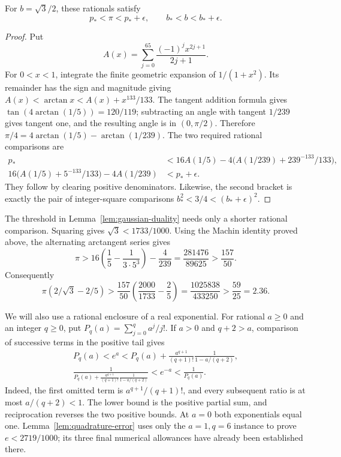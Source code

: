 \begin{lemma}\label{lem:rational-pi-b}
For $b=\sqrt3/2$, these rationals satisfy
\begin{equation}\label{eq:rational-pi-b-error}
 p_*<\pi<p_*+\epsilon,\qquad b_*<b<b_*+\epsilon.
\end{equation}
\end{lemma}
\begin{proof}
Put
\[
 A(x)=\sum_{j=0}^{65}\frac{(-1)^jx^{2j+1}}{2j+1}.
\]
For $0<x<1$, integrate the finite geometric expansion of $1/(1+x^2)$.
Its remainder has the sign and magnitude giving
$A(x)<\arctan x<A(x)+x^{133}/133$.  The tangent addition formula gives
$\tan(4\arctan(1/5))=120/119$; subtracting an angle with tangent $1/239$
gives tangent one, and the resulting angle is in $(0,\pi/2)$.  Therefore
$\pi/4=4\arctan(1/5)-\arctan(1/239)$.  The two required rational comparisons
are
\[
\begin{split}
 p_*&<16A(1/5)-4\bigl(A(1/239)+239^{-133}/133\bigr),\\
 16\bigl(A(1/5)+5^{-133}/133\bigr)-4A(1/239)&<p_*+\epsilon.
\end{split}
\]
They follow by clearing positive denominators.  Likewise, the second bracket
is exactly the pair of integer-square comparisons
$b_*^2<3/4<(b_*+\epsilon)^2$.
\end{proof}

The threshold in Lemma~\ref{lem:gaussian-duality} needs only a shorter
rational comparison.  Squaring gives $\sqrt3<1733/1000$.  Using the
Machin identity proved above, the alternating arctangent series gives
\[
 \pi>16\left(\frac15-\frac1{3\cdot5^3}\right)-\frac4{239}
 =\frac{281476}{89625}>\frac{157}{50}.
\]
Consequently
\[
 \pi(2/\sqrt3-2/5)
 >\frac{157}{50}\left(\frac{2000}{1733}-\frac25\right)
 =\frac{1025838}{433250}>\frac{59}{25}=2.36.
\]

We will also use a rational enclosure of a real exponential.  For rational
$a\ge0$ and an integer $q\ge0$, put $P_q(a)=\sum_{j=0}^qa^j/j!$.
If $a>0$ and $q+2>a$, comparison of successive terms in the positive tail
gives
\begin{equation}\label{eq:scalar-rational-enclosure}
\begin{gathered}
 P_q(a)<e^a<
 P_q(a)+\frac{a^{q+1}}{(q+1)!}\frac1{1-a/(q+2)},\\
 \frac1{P_q(a)+\frac{a^{q+1}}{(q+1)!}\frac1{1-a/(q+2)}}
 <e^{-a}<\frac1{P_q(a)}.
\end{gathered}
\end{equation}
Indeed, the first omitted term is $a^{q+1}/(q+1)!$, and every subsequent
ratio is at most $a/(q+2)<1$.  The lower bound is the positive partial sum,
and reciprocation reverses the two positive bounds.  At $a=0$ both
exponentials equal one.  Lemma~\ref{lem:quadrature-error} uses only the
$a=1,q=6$ instance to prove $e<2719/1000$; its three final numerical
allowances have already been established there.

